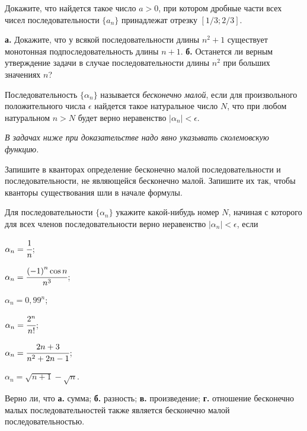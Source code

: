 \documentclass[a4paper, 12pt, num=25]{listok}
\begin{document}
\begin{problem}
	Докажите, что найдется такое число $a > 0$,
	при котором дробные части всех чисел последовательности $\{a_n\}$ принадлежат отрезку $[1/3; 2/3]$.
\end{problem}
\begin{problem}
	\textbf{а.} Докажите, что у всякой последовательности длины $n^2 + 1$ существует монотонная подпоследовательность длины $n + 1$.
	\textbf{б.} Останется ли верным утверждение задачи в случае последовательности длины $n^2$ при больших значениях $n$?
\end{problem}
\begin{definition}
	Последовательность $\{\alpha_n\}$ называется \textit{бесконечно малой}, если для произвольного положительного числа $\epsilon$
	найдется такое натуральное число $N$, что при любом натуральном $n > N$ будет верно неравенство $|\alpha_n| < \epsilon$.
\end{definition}
\begin{center}
	\textit{В задачах ниже при доказательстве надо явно указывать сколемовскую функцию.}
\end{center}
\begin{problem}
	Запишите в кванторах определение бесконечно малой последовательности и последовательности, не являющейся бесконечно малой.
	Запишите их так, чтобы кванторы существования шли в начале формулы.
\end{problem}
\begin{problem}
	Для последовательности $\{\alpha_n\}$ укажите какой-нибудь номер $N$, начиная с которого для всех членов последовательности верно неравенство
	$|\alpha_n| < \epsilon$, если
	\begin{multienum}{3}
		\item $\alpha_n = \cfrac1n$;
		\item $\alpha_n = \cfrac{{(-1)}^n \cos n}{n^3}$;
		\item $\alpha_n = {0{,}99}^n$;
		\item $\alpha_n = \cfrac{2^n}{n!}$;
		\item $\alpha_n = \cfrac{2n+3}{n^2+2n-1}$;
		\item $\alpha_n = \sqrt{n + 1} - \sqrt n$.
	\end{multienum}
\end{problem}
\begin{problem}
	Верно ли, что \textbf{а.} сумма; \textbf{б.} разность; \textbf{в.} произведение; \textbf{г.} отношение бесконечно малых последовательностей
	также является бесконечно малой последовательностью.
\end{problem}
\end{document}
